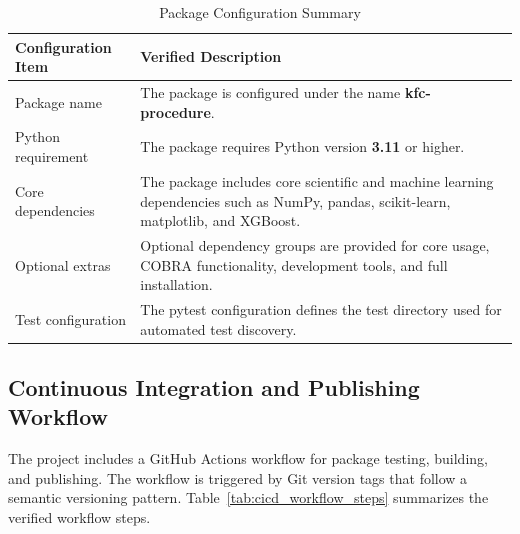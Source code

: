 \begin{table}[H]
      \centering
      \caption{Package Configuration Summary}
      \label{tab:package_configuration_summary}
      \renewcommand{\arraystretch}{1.2}
      \begin{tabularx}{\textwidth}{
                  >{\raggedright\arraybackslash}p{4.0cm}
                  >{\raggedright\arraybackslash}X
            }
            \toprule
            \textbf{Configuration Item} & \textbf{Verified Description}                                                                          \\
            \midrule
            Package name                &
            The package is configured under the name \textbf{kfc-procedure}.                                                                     \\

            Python requirement          &
            The package requires Python version \textbf{3.11} or higher.                                                                         \\

            Core dependencies           &
            The package includes core scientific and machine learning dependencies such as NumPy, pandas, scikit-learn, matplotlib, and XGBoost. \\

            Optional extras             &
            Optional dependency groups are provided for core usage, COBRA functionality, development tools, and full installation.               \\

            Test configuration          &
            The pytest configuration defines the test directory used for automated test discovery.                                               \\
            \bottomrule
      \end{tabularx}
\end{table}

\subsection{Continuous Integration and Publishing Workflow}

\hs The project includes a GitHub Actions workflow for package testing, building, and publishing. The workflow is triggered by Git version tags that follow a semantic versioning pattern. Table~\ref{tab:cicd_workflow_steps} summarizes the verified workflow steps.

